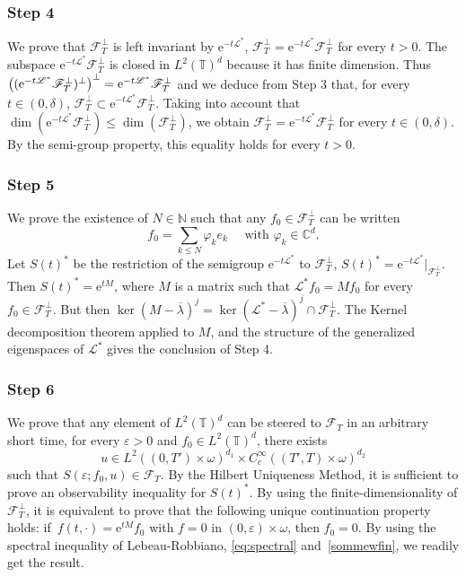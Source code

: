 \documentclass[10pt]{amsart}
\let\mathcal\mathscr
\theoremstyle{plain}
\theoremstyle{definition}
\theoremstyle{remark}
\newcommand{\set}{\mathbb}
\newcommand{\N}{\set{N}}
\renewcommand{\C}{\set{C}}
\newcommand{\T}{\set{T}}
\newcommand{\eu}{\mathrm e}
\let\originalleft\left
\let\originalright\right
\renewcommand{\left}{\mathopen{}\mathclose\bgroup\originalleft}
\renewcommand{\right}{\aftergroup\egroup\originalright}
\begin{document}
\subsubsection*{Step 4}
We prove that $\mathcal{F}_{T}^{\perp}$ is left invariant by $\eu^{-t {\mathcal{L}^*}}$, \ie $\mathcal{F}_{T}^{\perp}=\eu^{-t {\mathcal{L}^*}} \mathcal{F}_{T}^{\perp}$ for every $t>0$.
The subspace $\eu^{-t {\mathcal{L}^*}} \mathcal{F}_{T}^{\perp}$ is closed in $L^2(\T)^d$ because it has finite dimension. Thus
$\left((\eu^{-t {\mathcal{L}^*}} \mathcal{F}_{T}^{\perp})^\perp \right)^\perp=\eu^{-t {\mathcal{L}^*}} \mathcal{F}_{T}^{\perp}$
and we deduce from Step 3 that, for every $t\in(0,\delta)$, $\mathcal{F}_{T}^\perp \subset \eu^{-t {\mathcal{L}^*}} \mathcal{F}_{T}^{\perp}$.
Taking into account that $\dim(\eu^{-t {\mathcal{L}^*}} \mathcal{F}_{T}^{\perp}) \leq \dim(\mathcal{F}_{T}^{\perp})$, we obtain $\mathcal{F}_{T}^\perp = \eu^{-t {\mathcal{L}^*}} \mathcal{F}_{T}^{\perp}$ for every $t\in(0,\delta)$. By the semi-group property, this equality holds for every $t >0$.

\subsubsection*{Step 5}
We prove the existence of $N\in\N$ such that any
$f_0 \in \mathcal{F}_{T}^{\perp}$ can be written\vspace*{-3pt}
\begin{equation}
f_0 = \sum_{k \leq N} \varphi_k e_k \quad \text{ with } \varphi_k \in \C^d.
\label{sommewfin}
\end{equation}
Let ${S}(t)^*$ be the restriction of the semigroup $\eu^{-t {\mathcal{L}^*}}$ to
$\mathcal{F}_{T}^{\perp}$, \ie ${S}(t)^* = \eu^{-t
{\mathcal{L}^*}}|_{\mathcal{F}_{T}^{\perp}}$. Then ${S}(t)^*=\eu^{tM}$, where $M$ is a matrix
such that ${\mathcal{L}^*} f_0 = M f_0$ for every $f_0 \in \mathcal{F}_{T}^{\perp}$. But then
$\ker(M-\overline{\lambda})^{j} = \ker({\mathcal{L}^*}-\overline{\lambda})^{j} \cap
\mathcal{F}_{T}^\perp$. The Kernel decomposition theorem applied to $M$, and the structure of
the generalized eigenspaces of $\mathcal{L}^*$ gives the conclusion of Step 4.

\subsubsection*{Step 6}
We prove that any element of $L^2(\T)^{d}$ can be steered to $\mathcal{F}_{T}$ in an arbitrary short time, \ie for every $\varepsilon >0$ and $f_0 \in L^2(\T)^{d}$, there exists
\[
u \in L^2((0,T')\times\omega)^{d_1} \times C^\infty_c ((T',T)\times\omega)^{d_2}
\]
such that $S(\varepsilon;f_0, u) \in \mathcal{F}_{T}$.
By the Hilbert Uniqueness Method, it is sufficient to prove an observability inequality for ${S}(t)^*$. By using the finite-dimensionality of $\mathcal{F}_{T}^{\perp}$, it is equivalent to prove that the following unique continuation property holds: if~$f(t,\cdot)=\eu^{tM} f_0$ with $f=0$ in $(0,\varepsilon)\times \omega$, then $f_0 = 0$. By using the spectral inequality of Lebeau-Robbiano, \ie \eqref{eq:spectral} and~\eqref{sommewfin}, we readily get the result.
\end{document}
